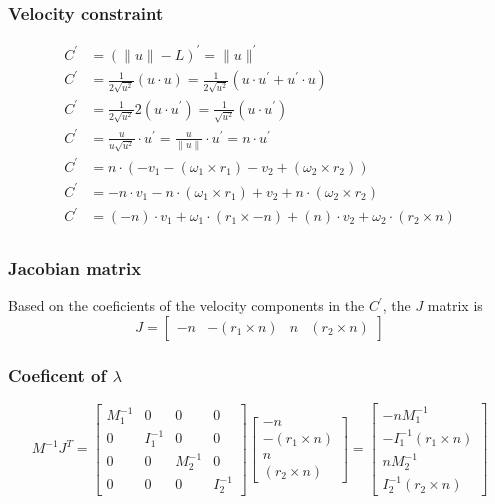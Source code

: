 \documentclass{article}
\begin{document}
	\subsubsection{Velocity constraint}
	\begin{align}
		C^{'} &= (\|u\|-L)^{'}=\|u\|^{'}\\
		C^{'} &= \frac{1}{2\sqrt{u^2}}(u\cdot u) = \frac{1}{2\sqrt{u^2}}(u\cdot u^{'}+u^{'}\cdot u)\\
		C^{'} &= \frac{1}{2\sqrt{u^2}}2(u\cdot u^{'}) = \frac{1}{\sqrt{u^2}}(u\cdot u^{'})\\
		C^{'} &= \frac{u}{u\sqrt{u^2}}\cdot u^{'} = \frac{u}{\|u\|}\cdot u^{'} = n\cdot u^{'}\\
		C^{'} &= n\cdot (-v_1-(\omega_1\times r_1)-v_2+(\omega_2\times r_2))\\
		C^{'} &= -n\cdot v_1-n\cdot(\omega_1\times r_1)+v_2+n\cdot(\omega_2\times r_2)\\
		C^{'} &= \boxed{(-n)}\cdot v_1+\omega_1\cdot\boxed{(r_1\times -n)}+\boxed{(n)}\cdot v_2+\omega_2\cdot\boxed{(r_2\times n)}\\
	\end{align}
	\subsubsection{Jacobian matrix}
	Based on the coeficients of the velocity components in the $C^{'}$, the $J$ matrix is
	$$ J=
	\begin{bmatrix}
		-n & -(r_1\times n) & n & (r_2\times n)
	\end{bmatrix}
	 $$
	\subsubsection{Coeficent of $\lambda$}
	$$
		M^{-1}J^T=	
		\begin{bmatrix}
			M_1^{-1} 	& 0 		& 0 		& 0\\
			0 			& I_1^{-1} 	& 0 		& 0\\
			0 			& 0 		& M_2^{-1} 	& 0\\
			0 			& 0 		& 0 		& I_2^{-1}
		\end{bmatrix}
		\begin{bmatrix}
			-n\\
			-(r_1\times n)\\
			n\\
			(r_2\times n)
		\end{bmatrix}
		=
		\begin{bmatrix}
			-nM_1^{-1}\\
			-I_1^{-1}(r_1\times n)\\
			nM_2^{-1}\\
			I_2^{-1}(r_2\times n)
		\end{bmatrix}
	$$
\end{document}

